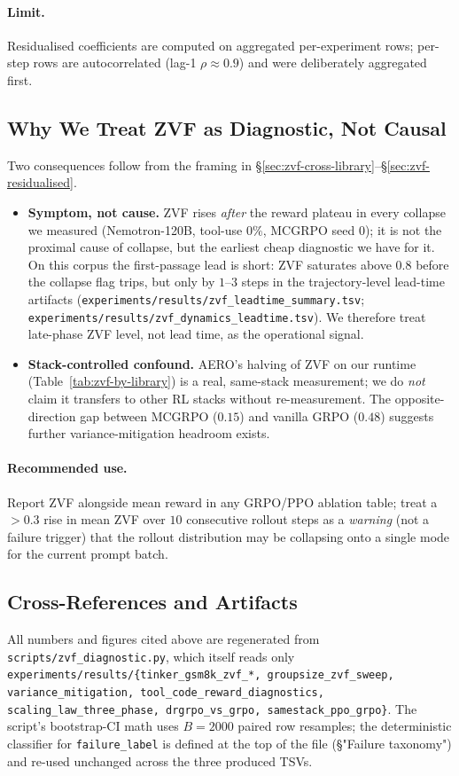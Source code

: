 \paragraph{Limit.} Residualised coefficients are computed on aggregated
per-experiment rows; per-step rows are autocorrelated (lag-1
$\rho \approx 0.9$) and were deliberately aggregated first.

\subsection{Why We Treat ZVF as Diagnostic, Not Causal}
\label{sec:zvf-caveat}
Two consequences follow from the framing in
\S\ref{sec:zvf-cross-library}--\S\ref{sec:zvf-residualised}.
\begin{itemize}
\item \textbf{Symptom, not cause.} ZVF rises \emph{after} the reward
plateau in every collapse we measured (Nemotron-120B, tool-use
$0\%$, MCGRPO seed 0); it is not the proximal cause of collapse, but
the earliest cheap diagnostic we have for it. On this corpus the first-passage
lead is short: ZVF saturates above $0.8$ before the collapse flag trips, but
only by $1$--$3$ steps in the trajectory-level lead-time artifacts
(\texttt{experiments/results/zvf\_leadtime\_summary.tsv};
\texttt{experiments/results/zvf\_dynamics\_leadtime.tsv}). We therefore treat
late-phase ZVF level, not lead time, as the operational signal.
\item \textbf{Stack-controlled confound.} AERO's halving of ZVF on our
runtime (Table~\ref{tab:zvf-by-library}) is a real, same-stack
measurement; we do \emph{not} claim it transfers to other RL
stacks without re-measurement. The opposite-direction gap between
MCGRPO ($0.15$) and vanilla GRPO ($0.48$) suggests further
variance-mitigation headroom exists.
\end{itemize}

\paragraph{Recommended use.} Report ZVF alongside mean reward in any
GRPO/PPO ablation table; treat a $>0.3$ rise in mean ZVF over
$10$ consecutive rollout steps as a \emph{warning} (not a failure
trigger) that the rollout distribution may be collapsing onto a
single mode for the current prompt batch.

\subsection{Cross-References and Artifacts}
\label{sec:zvf-artifacts}
All numbers and figures cited above are regenerated from
\texttt{scripts/zvf_diagnostic.py}, which itself reads only
\texttt{experiments/results/\{tinker_gsm8k_zvf_*, groupsize_zvf_sweep,
variance_mitigation, tool_code_reward_diagnostics,
scaling_law_three_phase, drgrpo_vs_grpo, samestack_ppo_grpo\}}. The
script's bootstrap-CI math uses $B{=}2000$ paired row resamples; the
deterministic classifier for \texttt{failure_label} is defined at the top
of the file (\S"Failure taxonomy") and re-used unchanged across the
three produced TSVs.

